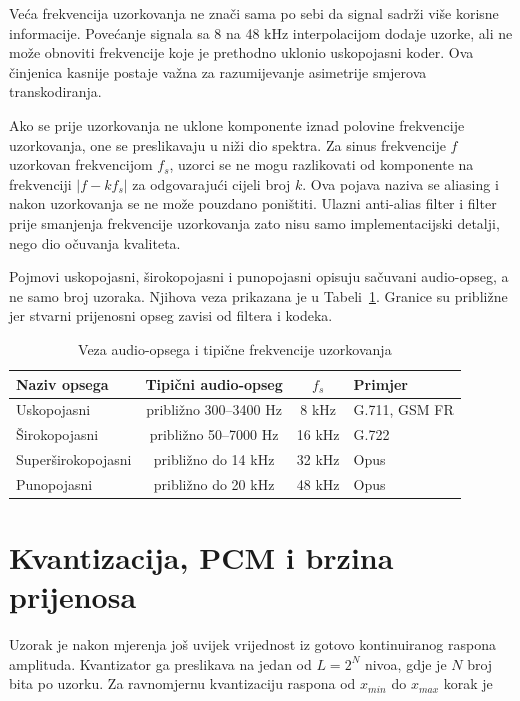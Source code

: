 Veća frekvencija uzorkovanja ne znači sama po sebi da signal sadrži više korisne informacije. Povećanje signala sa 8 na 48 kHz interpolacijom dodaje uzorke, ali ne može obnoviti frekvencije koje je prethodno uklonio uskopojasni koder. Ova činjenica kasnije postaje važna za razumijevanje asimetrije smjerova transkodiranja.

Ako se prije uzorkovanja ne uklone komponente iznad polovine frekvencije uzorkovanja, one se preslikavaju u niži dio spektra. Za sinus frekvencije $f$ uzorkovan frekvencijom $f_s$, uzorci se ne mogu razlikovati od komponente na frekvenciji $|f-kf_s|$ za odgovarajući cijeli broj $k$. Ova pojava naziva se aliasing i nakon uzorkovanja se ne može pouzdano poništiti. Ulazni anti-alias filter i filter prije smanjenja frekvencije uzorkovanja zato nisu samo implementacijski detalji, nego dio očuvanja kvaliteta.

Pojmovi uskopojasni, širokopojasni i punopojasni opisuju sačuvani audio-opseg, a ne samo broj uzoraka. Njihova veza prikazana je u Tabeli~\ref{tab:audio-bandwidth}. Granice su približne jer stvarni prijenosni opseg zavisi od filtera i kodeka.

\begin{table}[htbp]
\centering
\caption{Veza audio-opsega i tipične frekvencije uzorkovanja}
\label{tab:audio-bandwidth}
\small
\begin{tabular}{|l|c|c|l|}
\hline
\textbf{Naziv opsega} & \textbf{Tipični audio-opseg} & \textbf{$f_s$} & \textbf{Primjer} \\
\hline
Uskopojasni & približno 300--3400 Hz & 8 kHz & G.711, GSM FR \\
Širokopojasni & približno 50--7000 Hz & 16 kHz & G.722 \\
Superširokopojasni & približno do 14 kHz & 32 kHz & Opus \\
Punopojasni & približno do 20 kHz & 48 kHz & Opus \\
\hline
\end{tabular}
\end{table}

\section{Kvantizacija, PCM i brzina prijenosa}

Uzorak je nakon mjerenja još uvijek vrijednost iz gotovo kontinuiranog raspona amplituda. Kvantizator ga preslikava na jedan od $L=2^N$ nivoa, gdje je $N$ broj bita po uzorku. Za ravnomjernu kvantizaciju raspona od $x_{min}$ do $x_{max}$ korak je~\cite{gray-neuhoff}

